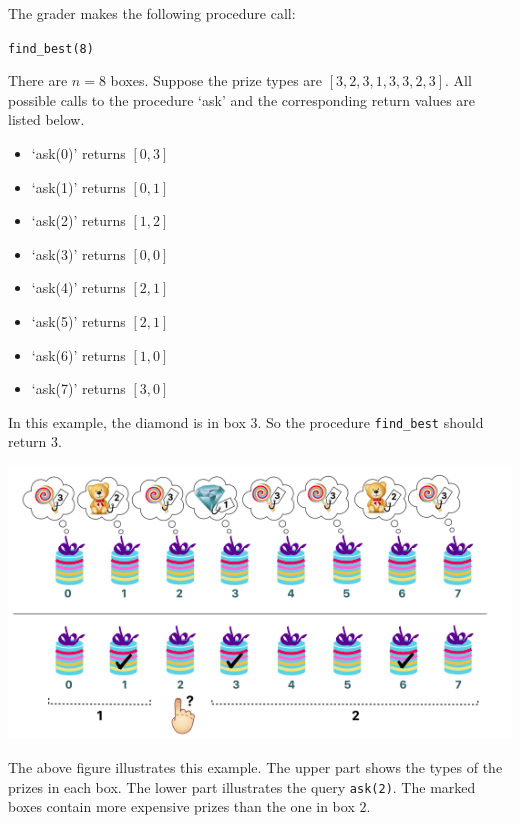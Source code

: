 The grader makes the following procedure call:

\texttt{find\_best(8)}

There are $n = 8$ boxes. Suppose the prize types are $[3,2,3,1,3,3,2,3]$.
All possible calls to the procedure `ask' and the corresponding return values are listed below.

\begin{itemize}
\item `ask(0)' returns $[0, 3]$
\item `ask(1)' returns $[0, 1]$
\item `ask(2)' returns $[1, 2]$
\item `ask(3)' returns $[0, 0]$
\item `ask(4)' returns $[2, 1]$
\item `ask(5)' returns $[2, 1]$
\item `ask(6)' returns $[1, 0]$
\item `ask(7)' returns $[3, 0]$
\end{itemize}

In this example, the diamond is in box $3$. So the procedure \texttt{find\_best} should return $3$.

\includegraphics{prize.png} 

The above figure illustrates this example. The upper part shows the types of the prizes in each box. The lower part illustrates the query \texttt{ask(2)}. The marked boxes contain more expensive prizes than the one in box $2$.